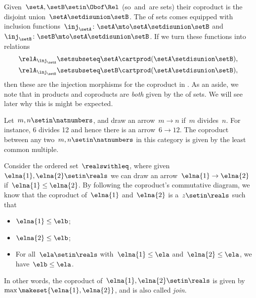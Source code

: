
\begin{example}
    Given~$\setA,\setB\setin \Obof\Rel$ (so~\setA and~\setB are sets) their coproduct is the disjoint union~$\setA \setdisunion \setB$.
    The  of sets comes equipped with inclusion functions~$\inj_\setA\colon \setA\mto \setA \setdisunion\setB$ and~$\inj_\setB\colon \setB\mto \setA \setdisunion\setB$.
    If we turn these functions into relations
    \begin{align}\label{eq:coprod-rel-inclusions}
        {\relA}_{\inj_\setA} & \setsubseteq \setA\cartprod (\setA \setdisunion\setB), \\
        {\relA}_{\inj_\setB} & \setsubseteq \setB\cartprod (\setA \setdisunion\setB),
    \end{align}
    then these are the injection morphisms for the coproduct in \Rel.
    As an aside, we note that in \Rel products and coproducts are \emph{both} given by the  of sets.
    We will see later why this is might be expected.
\end{example}

\begin{example}
    Let~$m,n\setin \natnumbers$, and draw an arrow~$m\to n$ if~$m$ divides~$n$.
    For instance, 6 divides 12 and hence there is an arrow~$6\to 12$.
    The coproduct between any two~$m,n\setin \natnumbers$ in this category is given by the least common multiple.
\end{example}

\begin{example}
    Consider the ordered set~$\realswithleq$, where given~$\elna{1},\elna{2}\setin \reals$ we can draw an arrow~$\elna{1}\to \elna{2}$ if~$\elna{1}\leq \elna{2}$.
    By following the coproduct's commutative diagram, we know that the coproduct of~$\elna{1}$ and~$\elna{2}$ is a~$z\setin \reals$ such that
    \begin{itemize}
        \item $\elna{1}\leq \elb$;
        \item $\elna{2}\leq \elb$;
        \item For all~$\ela\setin \reals$ with~$\elna{1}\leq \ela$ and~$\elna{2}\leq \ela$, we have~$\elb\leq \ela$.
    \end{itemize}
    In other words, the coproduct of~$\elna{1},\elna{2}\setin \reals$ is given by~$\max\makeset{\elna{1},\elna{2}}$, and is also called \emph{join}.
\end{example}

